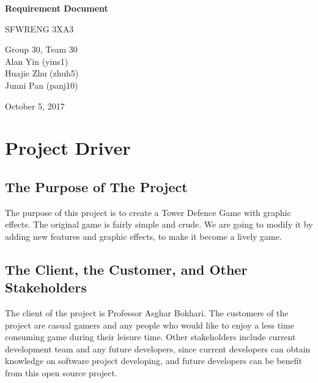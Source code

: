\documentclass[12pt]{article}
\begin{document}
\begin{titlepage}
    \begin{center}
        \vspace*{1cm}
        
        \Huge
        \textbf{Requirement Document}
        
        \vspace{0.5cm}
        \LARGE
        SFWRENG 3XA3
        
        \vspace{1.5cm}
        
        \Large
        Group 30, Team 30
		\\ Alan Yin (yins1)
		\\ Huajie Zhu (zhuh5)
		\\ Junni Pan (panj10)
        
        \vspace{1.5cm}
        
        \Large
        October 5, 2017
        
    \end{center}
\end{titlepage}

\newpage
\tableofcontents
\listoftables
\listoffigures


\newpage
\section{Project Driver}
\subsection{The Purpose of The Project}
The purpose of this project is to create a Tower Defence Game with graphic effects. The original game is fairly simple and crude. We are going to modify it by adding new features and graphic effects, to make it become a lively game.


\subsection{The Client, the Customer, and Other Stakeholders}
The client of the project is Professor Asghar Bokhari. The customers of the project are casual gamers and any people who would like to enjoy a less time consuming game during their leisure time. Other stakeholders include current development team and any future developers, since current developers can obtain knowledge on software project developing, and future developers can be benefit from this open source project. 
\end{document}
